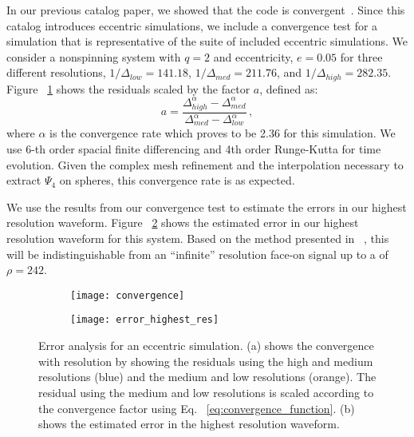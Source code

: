 \documentclass[
twocolumn,prd,
showpacs,
nofootinbib,
amsmath,amssymb,
superscriptaddress]{revtex4-1}
\begin{document}
In our previous catalog paper, we showed that the \maya{} code is convergent~\cite{Jani:2016wkt}.
Since this catalog introduces eccentric simulations, we include a convergence test for a simulation that is representative of the suite of included eccentric simulations.
We consider a nonspinning system with $q=2$ and eccentricity, $e=0.05$ for three different resolutions, $1/\Delta_{low} = 141.18$, $1/\Delta_{med} = 211.76$, and $1/\Delta_{high} =282.35$.
Figure ~\ref{fig:convergence} shows the residuals scaled by the factor $a$, defined as:
\begin{equation}
a=\frac{\Delta_{high}^{\alpha} - \Delta_{med}^{\alpha}}{\Delta_{med}^{\alpha} - \Delta_{low}^{\alpha}} \, ,
\label{eq:convergence_function}
\end{equation}
where $\alpha$ is the convergence rate which proves to be 2.36 for this simulation.
We use 6-th order spacial finite differencing and 4th order Runge-Kutta for time evolution. 
Given the complex mesh refinement and the interpolation necessary to extract $\Psi_4$ on spheres, this convergence rate is as expected. 

We  use the results from our convergence test to estimate the errors in our highest resolution waveform.
Figure ~\ref{fig:waveform uncertainty} shows the estimated error in our highest resolution waveform for this system.
Based on the method presented in ~\cite{Ferguson:2020xnm}, this will be indistinguishable from an ``infinite'' resolution face-on signal up to a \snr{} of $\rho = 242$.

\begin{figure}
\centering
\begin{subfigure}{.23\textwidth}
    \centering
   \texttt{[image: convergence]}
   \caption{ }
   \label{fig:convergence}
\end{subfigure}
\begin{subfigure}{.23\textwidth}
    \centering
    \texttt{[image: error\_highest\_res]}
    \caption{ }
    \label{fig:waveform uncertainty}
\end{subfigure}
\caption{Error analysis for an eccentric simulation.  (a) shows the convergence with resolution by showing the residuals using the high and medium resolutions (blue) and the medium and low resolutions (orange). The residual using the medium and low resolutions is scaled according to the convergence factor using Eq. ~\ref{eq:convergence_function}. 
(b) shows the estimated error in the highest resolution waveform. }
\label{fig:error}
\end{figure}
\end{document}
